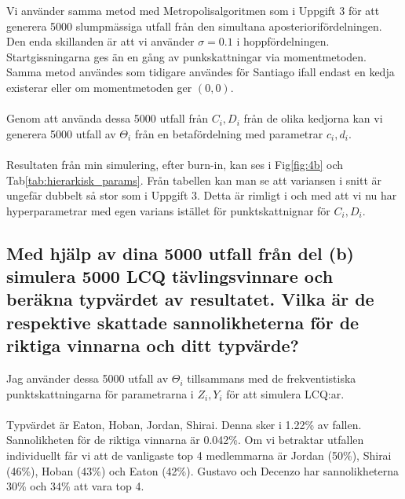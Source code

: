 \documentclass{article}
\begin{document}
Vi använder samma metod med Metropolisalgoritmen som i Uppgift 3 för att generera 5000 slumpmässiga utfall från den simultana aposteriorifördelningen. Den enda skillanden är att vi använder $\sigma = 0.1$ i hoppfördelningen.
Startgissningarna ges än en gång av punkskattningar via momentmetoden. Samma metod användes som tidigare användes för Santiago ifall endast en kedja existerar eller om momentmetoden ger $(0,0)$.
\\\\
Genom att använda dessa 5000 utfall från $C_i, D_i$ från de olika kedjorna kan vi generera 5000 utfall av $\Theta_i$ från en betafördelning med parametrar $c_i, d_i$.
\\\\
Resultaten från min simulering, efter burn-in, kan ses i Fig\ref{fig:4b} och Tab\ref{tab:hierarkisk_params}.
Från tabellen kan man se att variansen i snitt är ungefär dubbelt så stor som i Uppgift 3.
Detta är rimligt i och med att vi nu har hyperparametrar med egen varians istället för punktskattnignar för $C_i, D_i$.

\subsection{Med hjälp av dina 5000 utfall från del (b) simulera 5000 LCQ tävlingsvinnare och beräkna typvärdet av resultatet.
Vilka är de respektive skattade sannolikheterna för de riktiga vinnarna och ditt typvärde?}

Jag använder dessa 5000 utfall av $\Theta_i$ tillsammans med de frekventistiska punktskattningarna för parametrarna i $Z_i, Y_i$ för att simulera LCQ:ar.
\\\\
Typvärdet är Eaton, Hoban, Jordan, Shirai. Denna sker i 1.22\% av fallen. Sannolikheten för de riktiga vinnarna är 0.042\%. 
Om vi betraktar utfallen individuellt får vi att de vanligaste top 4 medlemmarna är Jordan (50\%), Shirai (46\%), Hoban (43\%) och Eaton (42\%). 
Gustavo och Decenzo har sannolikheterna 30\% och 34\% att vara top 4.
\end{document}
